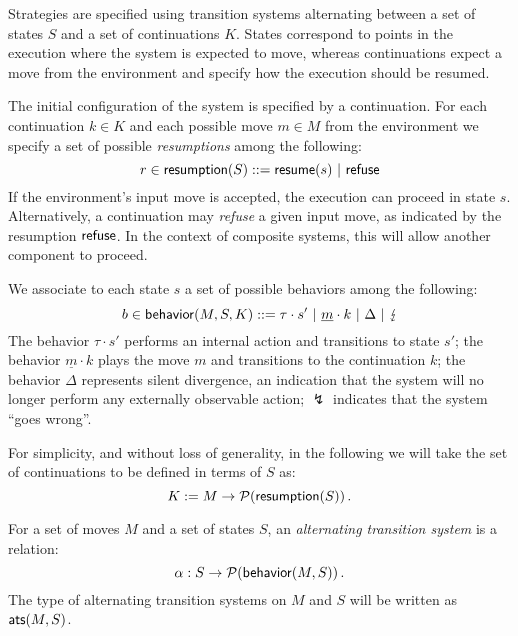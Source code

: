 Strategies are specified using transition systems
alternating between a set of states $S$ and
a set of continuations $K$.
States correspond to points in the execution
where the system is expected to move,
whereas continuations expect a move from the environment
and specify how the execution should be resumed.

The initial configuration of the system
is specified by a continuation.
For each continuation $k \in K$
and each possible move $m \in M$ from the environment
we specify a set of possible \emph{resumptions}
among the following:
\[ r \in  \mathsf{resumption} (S) ::=
	 \mathsf{resume} (s) \ |\  \mathsf{refuse}  \]
If the environment's input move is accepted,
the execution can proceed in state $s$.
Alternatively,
a continuation may \emph{refuse} a given input move,
as indicated by the resumption $ \mathsf{refuse} $.
In the context of composite systems,
this will allow another component to proceed.

We associate to each state $s$ a set of possible
behaviors among the following:
\[ b \in \kw{behavior}(M,S,K) ::=
	\tau \cdot s' \ |\
	\underline{m} \cdot k \ | \
	\Delta \ |\ 
	\lightning \]
The behavior $\tau \cdot s'$
performs an internal action and transitions to state $s'$;
the behavior $\underline{m} \cdot k$
plays the move $m$ and transitions to the continuation $k$;
the behavior $\Delta$ represents silent divergence,
an indication that the system will no longer perform
any externally observable action;
$\lightning$ indicates that the system ``goes wrong''.

For simplicity, and without loss of generality,
in the following we will take the set of continuations
to be defined in terms of $S$ as:
\[ K := M \rightarrow \mathcal{P}( \mathsf{resumption} (S)) \,. \]

\begin{definition}[Alternating transition system]
For a set of moves $M$ and a set of states $S$,
an \emph{alternating transition system} is a relation:
\[
  \alpha : S \rightarrow \mathcal{P}( \mathsf{behavior} (M, S)) \,.
\]
The type of alternating transition systems on $M$ and $S$
will be written as $ \mathsf{ats} (M, S)$.
\end{definition}

